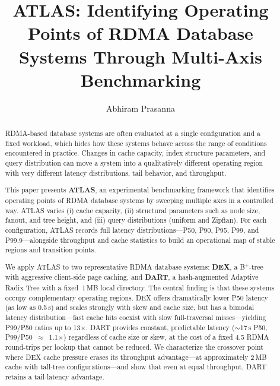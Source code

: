 \documentclass[sigconf, nonacm]{acmart}
\begin{document}
\title{ATLAS: Identifying Operating Points of RDMA Database Systems Through Multi-Axis Benchmarking}

\author{Abhiram Prasanna}

\begin{abstract}
RDMA-based database systems are often evaluated at a single configuration and a fixed workload, which hides how these systems behave across the range of conditions encountered in practice. Changes in cache capacity, index structure parameters, and query distribution can move a system into a qualitatively different operating region with very different latency distributions, tail behavior, and throughput.

This paper presents \textbf{ATLAS}, an experimental benchmarking framework that identifies operating points of RDMA database systems by sweeping multiple axes in a controlled way. ATLAS varies (i) cache capacity, (ii) structural parameters such as node size, fanout, and tree height, and (iii) query distributions (uniform and Zipfian). For each configuration, ATLAS records full latency distributions---P50, P90, P95, P99, and P99.9---alongside throughput and cache statistics to build an operational map of stable regions and transition points.

We apply ATLAS to two representative RDMA database systems: \textbf{DEX}, a B$^+$-tree with aggressive client-side page caching, and \textbf{DART}, a hash-augmented Adaptive Radix Tree with a fixed~1\,MB local directory. The central finding is that these systems occupy complementary operating regions. DEX offers dramatically lower P50 latency (as low as 0.5\,\textmu s) and scales strongly with skew and cache size, but has a bimodal latency distribution---fast cache hits coexist with slow full-traversal misses---yielding P99/P50 ratios up to 13$\times$. DART provides constant, predictable latency (${\sim}$17\,\textmu s P50, P99/P50~$\approx$~1.1$\times$) regardless of cache size or skew, at the cost of a fixed 4.5 RDMA round-trips per lookup that cannot be reduced. We characterize the crossover point where DEX cache pressure erases its throughput advantage---at approximately 2\,MB cache with tall-tree configurations---and show that even at equal throughput, DART retains a tail-latency advantage.
\end{abstract}

\maketitle
\end{document}
